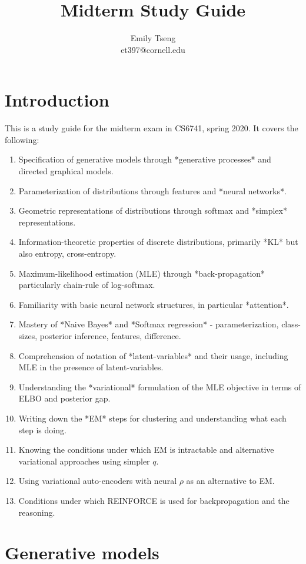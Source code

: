 \documentclass[11pt]{article}
\title{Midterm Study Guide}
\author{Emily Tseng \\ et397@cornell.edu }
\begin{document}
\maketitle{}
\section{Introduction}

This is a study guide for the midterm exam in CS6741, spring 2020. It covers the following:

\begin{enumerate}
  \item Specification of generative models through *generative processes* and directed graphical models.
  \item Parameterization of distributions through features and *neural networks*. 
  \item Geometric representations of distributions through softmax and *simplex* representations. 
  \item Information-theoretic properties of discrete distributions, primarily *KL* but also entropy, cross-entropy. 
  \item Maximum-likelihood estimation (MLE) through *back-propagation* particularly chain-rule of log-softmax.
  \item Familiarity with basic neural network structures, in particular *attention*.
  \item Mastery of *Naive Bayes* and *Softmax regression* - parameterization, class-sizes, posterior inference, features, difference. 
  \item Comprehension of notation of *latent-variables* and their usage, including MLE in the presence of latent-variables.
  \item Understanding the *variational* formulation of the MLE objective in terms of ELBO and posterior gap. 
  \item Writing down the *EM* steps for clustering and understanding what each step is doing.
  \item Knowing the conditions under which EM is intractable and alternative variational approaches using simpler $q$.
  \item Using variational auto-encoders with neural $\rho$ as an alternative to EM.
  \item Conditions under which REINFORCE is used for backpropagation and the reasoning.
\end{enumerate}


\section{Generative models}
\end{document}
